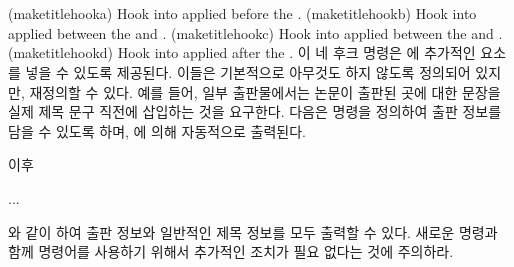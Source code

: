 \begin{syntax}
\cmd{\maketitlehooka} \cmd{\maketitlehookb} \\
\cmd{\maketitlehookc} \cmd{\maketitlehookd} \\
\end{syntax}
\glossary(maketitlehooka)%
  {}%
  {Hook into  applied before the .}
\glossary(maketitlehookb)%
  {}%
  {Hook into  applied between the  and .}
\glossary(maketitlehookc)%
  {}%
  {Hook into  applied between the  and .}
\glossary(maketitlehookd)%
  {}%
  {Hook into  applied after the .}
이 네 후크 명령은 \cmd{\maketitle}에 추가적인 요소를 넣을 수 있도록 제공된다.
이들은 기본적으로 아무것도 하지 않도록 정의되어 있지만, 재정의할 수 있다.
예를 들어, 일부 출판물에서는 논문이 출판된 곳에 대한 문장을 실제 제목 문구
직전에 삽입하는 것을 요구한다.
다음은 \cmd{\published} 명령을 정의하여 출판 정보를 담을 수 있도록 하며,
\cmd{\maketitle}에 의해 자동적으로 출력된다.
\begin{lcode}
\newcommand{\published}[1]{%
   \gdef\puB{#1}}
\newcommand{\puB}{}
\renewcommand{\maketitlehooka}{%
   \par\noindent \puB}
\end{lcode}
이후
\begin{lcode}
...
\maketitle
\end{lcode}
와 같이 하여 출판 정보와 일반적인 제목 정보를 모두 출력할 수 있다.
새로운 \cmd{\published} 명령과 함께 \cmd{\thanks} 명령어를 사용하기 위해서
추가적인 조치가 필요 없다는 것에 주의하라.

